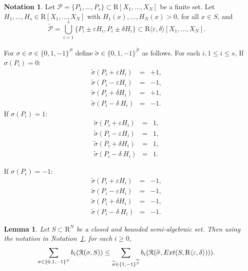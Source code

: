 \documentclass[10pt]{amsart}
\newtheorem{lemma}{Lemma}[section]
\theoremstyle{definition}
\newtheorem{notation}{Notation}[section]
\theoremstyle{remark}
\numberwithin{equation}{section}
\newcommand {\R} {\mathrm{R}}
\newcommand {\RR} {{\mathcal R}}
\newcommand {\la}   {{\langle}}
\newcommand {\ra}   {{\rangle}}
\newcommand {\eps} {{\varepsilon}}
\newcommand {\E} {{\rm Ext}}
\begin{document}
\begin{notation}
\label{not:lem:main:ordered:c:1}
Let $\mathcal{P} = \{P_1,\ldots,P_s\}  \subset \R[X_1,\ldots,X_N]$ be a finite set.
Let $H_1,\ldots,H_s \in \R[X_1,\ldots,X_N]$ with
$H_1(x),\ldots, H_N(x) > 0$, for all $x \in S$,
and 
\[
\widetilde{\mathcal{P}} = \bigcup_{i=1}^{s} \{P_i \pm \eps H_i, P_i \pm \delta H_i\} \subset \R\la\eps,\delta\ra[X_1,\ldots,X_N]. 
\]

For $\sigma \in \sigma \in \{0,1,-1\}^{\mathcal{P}}$ define
    $\widetilde{\sigma} \in \{0,1,-1\}^{\widetilde{\mathcal{P}}}$ as follows. For each $i, 1 \leq i \leq s$,
    If $\sigma(P_i) = 0$:
    \begin{eqnarray*}
    \widetilde{\sigma}(P_i + \eps H_i) &=& +1, \\
    \widetilde{\sigma}(P_i - \eps H_i) &=&  -1,\\
    \widetilde{\sigma}(P_i + \delta H_i) &=& +1, \\
    \widetilde{\sigma}(P_i -  \delta\ H_i) &=& -1. 
    \end{eqnarray*}
    If $\sigma(P_i) = 1$:
    \begin{eqnarray*}
    \widetilde{\sigma}(P_i + \eps H_i) &=& 1, \\
    \widetilde{\sigma}(P_i - \eps H_i) &=&  1,\\
    \widetilde{\sigma}(P_i + \delta H_i) &=& 1, \\
    \widetilde{\sigma}(P_i -  \delta\ H_i) &=& 1. 
    \end{eqnarray*}

    If $\sigma(P_i) = -1$:
    \begin{eqnarray*}
    \widetilde{\sigma}(P_i + \eps H_i) &=& -1, \\
    \widetilde{\sigma}(P_i - \eps H_i) &=&  -1,\\
    \widetilde{\sigma}(P_i + \delta H_i) &=& -1, \\
    \widetilde{\sigma}(P_i -  \delta\ H_i) &=& -1. 
    \end{eqnarray*}
\end{notation}

\begin{lemma}
\label{lem:main:ordered:c:1}
Let $S \subset \R^N$ be a closed and bounded semi-algebraic set.  
Then using the notation in Notation~\ref{not:lem:main:ordered:c:1},
for each $i \geq 0$,
\[
\sum_{\sigma \in \{0,1,-1\}^{\mathcal{P}}} b_i(\RR(\sigma,S)) 
\leq 
\sum_{\widetilde{\sigma} \in \{1,-1\}^{\widetilde{\mathcal{P}}}} b_i(\RR(\widetilde{\sigma},\E(S,\R\la\eps,\delta\ra))). 
\]
\end{lemma}
\end{document}
